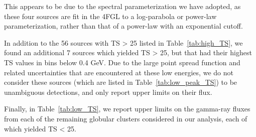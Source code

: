 \noindent
This appears to be due to the spectral parameterization we have adopted, as these four sources are fit in the 4FGL to a log-parabola or power-law parameterization, rather than that of a power-law with an exponential cutoff.

In addition to the 56 sources with TS > 25 listed in Table~\ref{tab:high_TS}, we found an additional 7 sources which yielded TS > 25, but that had their highest TS values in bins below 0.4 GeV. Due to the large point spread function and related uncertainties that are encountered at these low energies, we do not consider these sources (which are listed in Table~\ref{tab:low_peak_TS}) to be unambiguous detections, and only report upper limits on their flux.

Finally, in Table~\ref{tab:low_TS}, we report upper limits on the gamma-ray fluxes from each of the remaining globular clusters considered in our analysis, each of which yielded TS < 25. 

